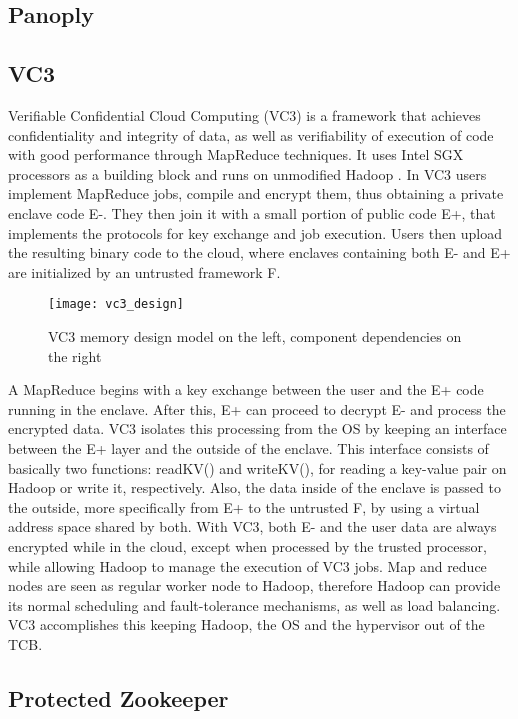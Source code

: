 \subsection{Panoply}
\subsection{VC3}
\label{ssec:vc3_mapreduce}

Verifiable Confidential Cloud Computing (VC3) \cite{vc3Paper} is a framework that achieves confidentiality and integrity of data, as well as verifiability of execution of code with good performance through MapReduce \cite{mapReduce} techniques. It uses Intel SGX processors as a building block and runs on unmodified Hadoop \cite{hadoop}.
In VC3 users implement MapReduce jobs, compile and encrypt them, thus obtaining a private enclave code E-. They then join it with a small portion of public code E+, that implements the protocols for key exchange and job execution.
Users then upload the resulting binary code to the cloud, where enclaves containing both E- and E+ are initialized by an untrusted framework F. 

\begin{figure}[htbp]
	\centering
	{\texttt{[image: vc3\_design]}}%
	\caption{VC3 memory design model on the left, component dependencies on the right}
\end{figure}

A MapReduce begins with a key exchange between the user and the E+ code running in the enclave. After this, E+ can proceed to decrypt E- and process the encrypted data. VC3 isolates this processing from the OS by keeping an interface between the E+ layer and the outside of the enclave. This interface consists of basically two functions: readKV() and writeKV(), for reading a key-value pair on Hadoop or write it, respectively. Also, the data inside of the enclave is passed to the outside, more specifically from E+ to the untrusted F, by using a virtual address space shared by both.
With VC3, both E- and the user data are always encrypted while in the cloud, except when processed by the trusted processor, while allowing Hadoop to manage the execution of VC3 jobs. Map and reduce nodes are seen as regular worker node to Hadoop, therefore Hadoop can provide its normal scheduling and fault-tolerance mechanisms, as well as load balancing. VC3 accomplishes this keeping Hadoop, the OS and the hypervisor out of the TCB.

\subsection{Protected Zookeeper}
\label{ssec:protected_zookeeper}

